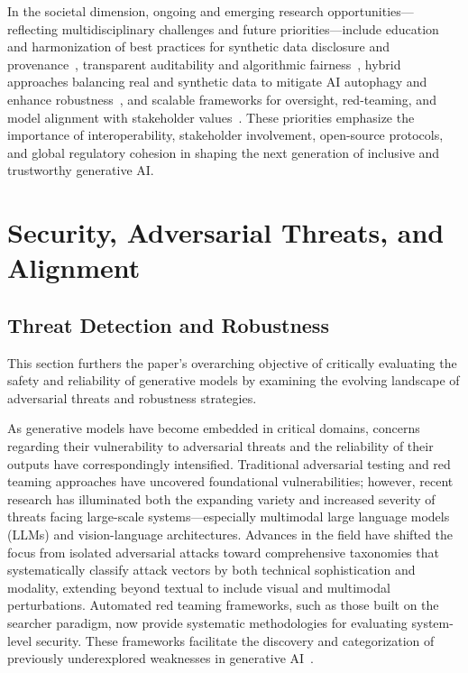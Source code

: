 \documentclass[sigconf]{acmart}
\begin{document}
In the societal dimension, ongoing and emerging research opportunities—reflecting multidisciplinary challenges and future priorities—include education and harmonization of best practices for synthetic data disclosure and provenance~\cite{ref7,ref88}, transparent auditability and algorithmic fairness~\cite{ref13,ref24,ref67,ref82,ref88}, hybrid approaches balancing real and synthetic data to mitigate AI autophagy and enhance robustness~\cite{ref81,ref82,ref88}, and scalable frameworks for oversight, red-teaming, and model alignment with stakeholder values~\cite{ref67,ref69,ref82,ref88,ref89}. These priorities emphasize the importance of interoperability, stakeholder involvement, open-source protocols, and global regulatory cohesion in shaping the next generation of inclusive and trustworthy generative AI.

\section{Security, Adversarial Threats, and Alignment}

\subsection{Threat Detection and Robustness}

This section furthers the paper's overarching objective of critically evaluating the safety and reliability of generative models by examining the evolving landscape of adversarial threats and robustness strategies.

As generative models have become embedded in critical domains, concerns regarding their vulnerability to adversarial threats and the reliability of their outputs have correspondingly intensified. Traditional adversarial testing and red teaming approaches have uncovered foundational vulnerabilities; however, recent research has illuminated both the expanding variety and increased severity of threats facing large-scale systems—especially multimodal large language models (LLMs) and vision-language architectures. Advances in the field have shifted the focus from isolated adversarial attacks toward comprehensive taxonomies that systematically classify attack vectors by both technical sophistication and modality, extending beyond textual to include visual and multimodal perturbations. Automated red teaming frameworks, such as those built on the searcher paradigm, now provide systematic methodologies for evaluating system-level security. These frameworks facilitate the discovery and categorization of previously underexplored weaknesses in generative AI~\cite{ref67, ref85}.
\end{document}
